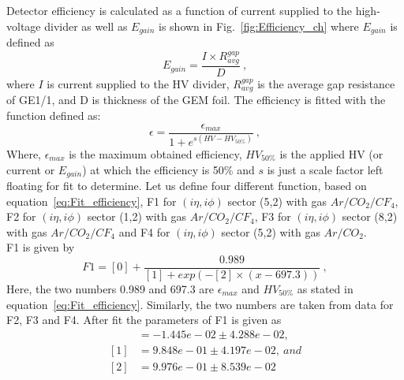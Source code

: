 Detector efficiency is calculated as a function of current supplied to the high-voltage divider as well as $E_{gain}$ is shown in Fig.~\ref{fig:Efficiency_ch} where $E_{gain}$ is defined as
\begin{equation}
E_{gain} = \frac{I\times R_{avg}^{gap}}{D}~,
\end{equation}
where $I$ is current supplied to the HV divider, $R_{avg}^{gap}$ is the average gap resistance of GE1/1, and D is thickness of the GEM foil.
The efficiency is fitted with the function defined as:
\begin{equation}\label{eq:Fit_efficiency}
    \epsilon = \frac{\epsilon_{max}}{1+e^{s(HV-HV_{50\%})}}~,
\end{equation}
Where, $\epsilon_{max}$ is the maximum obtained efficiency, $HV_{50\%}$ is the applied HV (or current or $E_{gain}$) at which the efficiency is 50\% and $s$ is just a scale factor left floating for fit to determine.
Let us define four different function, based on equation~\ref{eq:Fit_efficiency}, F1 for $(i\eta,i\phi)$ sector (5,2) with gas $Ar/CO_2/CF_4$, F2 for $(i\eta,i\phi)$ sector (1,2) with gas $Ar/CO_2/CF_4$, F3 for $(i\eta,i\phi)$ sector (8,2) with gas $Ar/CO_2/CF_4$ and F4 for $(i\eta,i\phi)$ sector (5,2) with gas $Ar/CO_2$.\\
F1 is given by 
\begin{equation}
    F1 = [0] + \frac{0.989}{[1]+exp(-[2]\times(x-697.3))}~,
\end{equation}
Here, the two numbers 0.989 and 697.3 are $\epsilon_{max}$ and $HV_{50\%}$ as stated in equation~\ref{eq:Fit_efficiency}. Similarly, the two numbers are taken from data for F2, F3 and F4.
After fit the parameters of F1 is given as
\begin{align*}
[0] &= -1.445e-02 \pm 4.288e-02,\\
[1] &= 9.848e-01 \pm 4.197e-02,~and \\
[2] &= 9.976e-01 \pm 8.539e-02
\end{align*}
